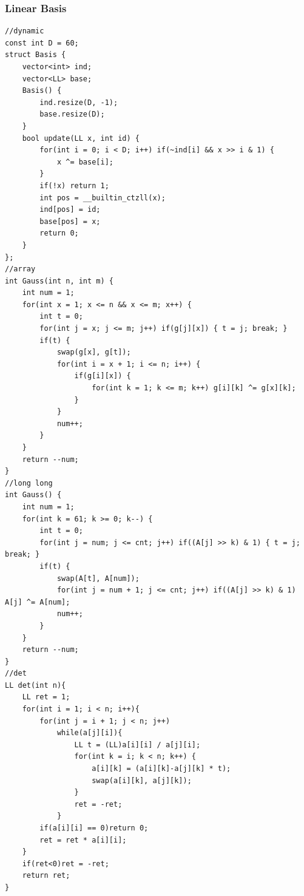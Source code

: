 \documentclass[10pt]{ctexart}
\begin{document}
{\subsubsection{Linear Basis}
\begin{lstlisting}
//dynamic
const int D = 60;
struct Basis {
    vector<int> ind;
    vector<LL> base;
    Basis() {
        ind.resize(D, -1);
        base.resize(D);
    }
    bool update(LL x, int id) {
        for(int i = 0; i < D; i++) if(~ind[i] && x >> i & 1) {
            x ^= base[i];
        }
        if(!x) return 1;
        int pos = __builtin_ctzll(x);
        ind[pos] = id;
        base[pos] = x;
        return 0;
    }
};
//array
int Gauss(int n, int m) {
    int num = 1;
    for(int x = 1; x <= n && x <= m; x++) {
        int t = 0;
        for(int j = x; j <= m; j++) if(g[j][x]) { t = j; break; }
        if(t) {
            swap(g[x], g[t]);
            for(int i = x + 1; i <= n; i++) {
                if(g[i][x]) {
                    for(int k = 1; k <= m; k++) g[i][k] ^= g[x][k];
                }
            }
            num++;
        }
    }
    return --num;
}
//long long
int Gauss() {
    int num = 1;
    for(int k = 61; k >= 0; k--) {
        int t = 0;
        for(int j = num; j <= cnt; j++) if((A[j] >> k) & 1) { t = j; break; }
        if(t) {
            swap(A[t], A[num]);
            for(int j = num + 1; j <= cnt; j++) if((A[j] >> k) & 1) A[j] ^= A[num];
            num++;
        }
    }
    return --num;
}
//det
LL det(int n){
	LL ret = 1;
	for(int i = 1; i < n; i++){
		for(int j = i + 1; j < n; j++)
			while(a[j][i]){
				LL t = (LL)a[i][i] / a[j][i];
				for(int k = i; k < n; k++) {
					a[i][k] = (a[i][k]-a[j][k] * t);
					swap(a[i][k], a[j][k]);
				}
				ret = -ret;
			}
		if(a[i][i] == 0)return 0;
		ret = ret * a[i][i];
	}
	if(ret<0)ret = -ret;
	return ret;
}
\end{lstlisting}
}
\end{document}
